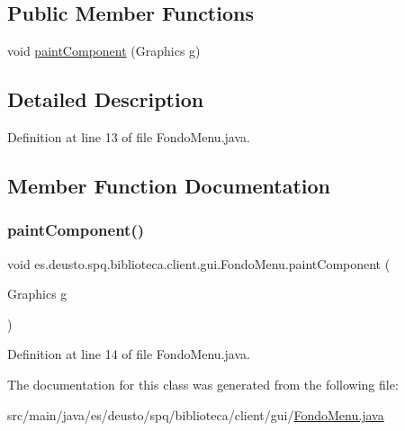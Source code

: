 \subsection*{Public Member Functions}
\begin{DoxyCompactItemize}
\item 
void \mbox{\hyperlink{classes_1_1deusto_1_1spq_1_1biblioteca_1_1client_1_1gui_1_1_fondo_menu_a98c9daab8e59effac9ced7819137cf9a}{paint\+Component}} (Graphics g)
\end{DoxyCompactItemize}


\subsection{Detailed Description}


Definition at line 13 of file Fondo\+Menu.\+java.



\subsection{Member Function Documentation}
\mbox{\label{classes_1_1deusto_1_1spq_1_1biblioteca_1_1client_1_1gui_1_1_fondo_menu_a98c9daab8e59effac9ced7819137cf9a}} 
\subsubsection{\texorpdfstring{paint\+Component()}{paintComponent()}}
{\footnotesize\ttfamily void es.\+deusto.\+spq.\+biblioteca.\+client.\+gui.\+Fondo\+Menu.\+paint\+Component (\begin{DoxyParamCaption}\item[{Graphics}]{g }\end{DoxyParamCaption})}



Definition at line 14 of file Fondo\+Menu.\+java.



The documentation for this class was generated from the following file\+:\begin{DoxyCompactItemize}
\item 
src/main/java/es/deusto/spq/biblioteca/client/gui/\mbox{\hyperlink{_fondo_menu_8java}{Fondo\+Menu.\+java}}\end{DoxyCompactItemize}
